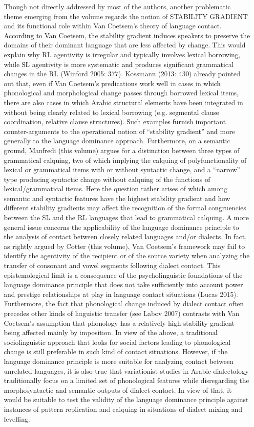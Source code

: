 \documentclass[output=paper]{langsci/langscibook}
\begin{document}
Though not directly addressed by most of the authors, another problematic theme emerging from the volume regards the notion of STABILITY GRADIENT and its functional role within Van Coetsem’s theory of language contact. According to Van Coetsem, the stability gradient induces speakers to preserve the domains of their dominant language that are less affected by change. This would explain why RL agentivity is irregular and typically involves lexical borrowing, while SL agentivity is more systematic and produces significant grammatical changes in the RL (Winford 2005: 377). Kossmann (2013: 430) already pointed out that, even if Van Coetsem’s predications work well in cases in which phonological and morphological change passes through borrowed lexical items, there are also cases in which Arabic structural elements have been integrated in  without being clearly related to lexical borrowing (e.g. segmental clause coordination, relative clause structures). Such examples furnish important counter-arguments to the operational notion of “stability gradient” and more generally to the language dominance approach. Furthermore, on a semantic ground, Manfredi (this volume) argues for a distinction between three types of grammatical calquing, two of which implying the calquing of polyfunctionality of lexical or grammatical items with or without syntactic change, and a “narrow” type producing syntactic change without calquing of the functions of lexical/grammatical items. Here the question rather arises of which among semantic and syntactic features have the highest stability gradient and how different stability gradients may affect the recognition of the formal congruencies between the SL and the RL languages that lead to grammatical calquing. 
A more general issue concerns the applicability of the language dominance principle to the analysis of contact between closely related languages and/or dialects. In fact, as rightly argued by Cotter (this volume), Van Coetsem’s framework may fail to identify the agentivity of the recipient or of the source variety when analyzing the transfer of consonant and vowel segments following dialect contact. This epistemological limit is a consequence of the psycholinguistic foundations of the language dominance principle that does not take sufficiently into account power and prestige relationships at play in language contact situations (Lucas 2015). Furthermore, the fact that phonological change induced by dialect contact often precedes other kinds of linguistic transfer (see Labov 2007) contrasts with Van Coetsem’s assumption that phonology has a relatively high stability gradient being affected mainly by imposition. In view of the above, a traditional sociolinguistic approach that looks for social factors leading to phonological change is still preferable in such kind of contact situations. However, if the language dominance principle is more suitable for analyzing contact between unrelated languages, it is also true that variationist studies in Arabic dialectology traditionally focus on a limited set of phonological features while disregarding the morphosyntactic and semantic outputs of dialect contact. In view of that, it would be suitable to test the validity of the language dominance principle against instances of pattern replication and calquing in situations of dialect mixing and levelling. 
\end{document}
